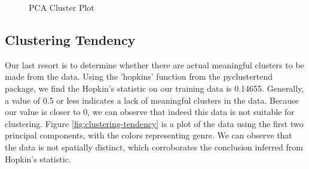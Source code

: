 \documentclass[conference]{IEEEtran}
\begin{document}
 \begin{figure}[!ht]
    \begin{center}
    \end{center}
    \caption{PCA Cluster Plot}
    \label{fig:cluster-plot-r2}
\end{figure}

\subsection{Clustering Tendency}
Our last resort is to determine whether there are actual meaningful clusters to be made from the data. Using the 'hopkins' function from the pyclustertend package, we find the Hopkin's statistic on our training data is 0.14655. Generally, a value of 0.5 or less indicates a lack of meaningful clusters in the data. Because our value is closer to 0, we can observe that indeed this data is not suitable for clustering. Figure \ref{fig:clustering-tendency} is a plot of the data using the first two principal components, with the colors representing genre. We can observe that the data is not spatially distinct, which corroborates the conclusion inferred from Hopkin's statistic.
\end{document}
